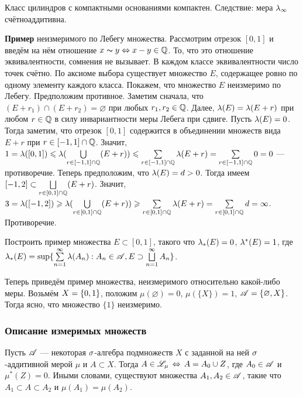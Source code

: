 \documentclass[10pt]{article}
\begin{document}
\begin{problem}
Класс цилиндров с компактными основаниями компактен. Следствие: мера
$\lambda_\infty$ счёт\-но\д аддитивна.
\end{problem}

\textbf{Пример} неизмеримого по Лебегу множества. Рассмотрим отрезок
$[0,1]$ и введём на нём отношение $x\thicksim y \bw\Lra x-y\in\Q$.
То, что это отношение эквивалентности, сомнения не вызывает. В
каждом классе эквивалентности число точек счётно. По аксиоме выбора
существует множество $E$, содержащее ровно по одному элементу
каждого класса. Покажем, что множество $E$ неизмеримо по Лебегу.
Предположим противное. Заметим сначала, что $(E+r_1)\cap
(E+r_2)=\varnothing$ при любых $r_1,r_2\in\mathbb{Q}$. Далее,
$\lambda(E)=\lambda(E+r)$ при любом $r\in\mathbb{Q}$ в силу инвариантности меры
Лебега при сдвиге. Пусть $\lambda(E)=0$. Тогда заметим, что отрезок
$[0,1]$ содержится в объединении множеств вида $E+r$ при
$r\in[-1,1]\cap\mathbb{Q}$. Значит, $1=\la([0,1])
\bw\le\la(\bigcup\limits_{r\in[-1,1]\cap\Q}(E+r))\bw
\le\sum\limits_{r\in[-1,1]\cap\Q}\la(E+r)\bw
=\sum\limits_{r\in[-1,1]\cap\Q}0=0$ --- противоречие. Теперь
предположим, что $\lambda(E)=d>0$. Тогда имеем $[-1,2]\subset
\bigsqcup\limits_{r\in[0,1]\cap\mathbb{Q}}(E+r)$. Значит, $3\bw =\la([-1,2])
\bw\ge\la(\bigcup\limits_{r\in[0,1]\cap\Q}(E+r))\bw
\ge\sum\limits_{r\in[0,1]\cap\Q}\la(E+r)\bw
=\sum\limits_{r\in[0,1]\cap\Q}d=\infty$. Противоречие.

\begin{problem}
Построить пример множества $E\subset[0,1]$, такого что $\lambda_*(E)=0$,
$\lambda^*(E)=1$, где $\la_*(E)\bw =\sup\{\sumnui\la(A_n):A_n\in\As,
E\supset\bigsqcup\limits_{n=1}^\infty A_n\}$.
\end{problem}

Теперь приведём пример множества, неизмеримого относительно
какой-либо меры. Возьмём $X\bw=\{0,1\}$, положим
$\mu(\varnothing)=0$, $\mu(\{X\})=1$, $\mathscr{A}=\{\varnothing, X\}$.
Тогда ясно, что множество $\{1\}$ неизмеримо.

\subsubsection{Описание измеримых множеств}

\begin{prop}\label{close_set_from_A}
Пусть $\mathscr{A}$ --- некоторая $\sigma$-алгебра подмножеств $X$ с заданной
на ней $\sigma$-аддитивной мерой $\mu$ и $A\subset X$. Тогда
$A\in\mathscr{L}_\mu\,\Leftrightarrow\,A=A_0\cup Z$, где $A_0\in\mathscr{A}$ и $\mu^*(Z)=0$.
Иными словами, существуют множества $A_1,A_2\in\mathscr{A}$, такие что
$A_1\subset A\subset A_2$ и $\mu(A_1)=\mu(A_2)$.
\end{prop}
\end{document}
